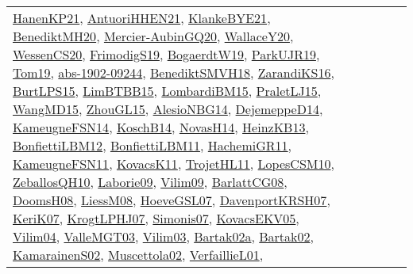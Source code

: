 {\begin{longtable}{lp{3cm}>{\raggedright}p{6cm}>{\raggedright}p{6cm}p{8cm}}
\href{papers/HanenKP21.pdf}{HanenKP21}\cite{HanenKP21}, \href{papers/AntuoriHHEN21.pdf}{AntuoriHHEN21}\cite{AntuoriHHEN21}, \href{papers/KlankeBYE21.pdf}{KlankeBYE21}\cite{KlankeBYE21}, \href{articles/BenediktMH20.pdf}{BenediktMH20}\cite{BenediktMH20}, \href{papers/Mercier-AubinGQ20.pdf}{Mercier-AubinGQ20}\cite{Mercier-AubinGQ20}, \href{articles/WallaceY20.pdf}{WallaceY20}\cite{WallaceY20}, \href{papers/WessenCS20.pdf}{WessenCS20}\cite{WessenCS20}, \href{papers/FrimodigS19.pdf}{FrimodigS19}\cite{FrimodigS19}, \href{papers/BogaerdtW19.pdf}{BogaerdtW19}\cite{BogaerdtW19}, \href{papers/ParkUJR19.pdf}{ParkUJR19}\cite{ParkUJR19}, \href{papers/Tom19.pdf}{Tom19}\cite{Tom19}, \href{articles/abs-1902-09244.pdf}{abs-1902-09244}\cite{abs-1902-09244}, \href{papers/BenediktSMVH18.pdf}{BenediktSMVH18}\cite{BenediktSMVH18}, \href{articles/ZarandiKS16.pdf}{ZarandiKS16}\cite{ZarandiKS16}, \href{papers/BurtLPS15.pdf}{BurtLPS15}\cite{BurtLPS15}, \href{papers/LimBTBB15.pdf}{LimBTBB15}\cite{LimBTBB15}, \href{papers/LombardiBM15.pdf}{LombardiBM15}\cite{LombardiBM15}, \href{papers/PraletLJ15.pdf}{PraletLJ15}\cite{PraletLJ15}, \href{articles/WangMD15.pdf}{WangMD15}\cite{WangMD15}, \href{papers/ZhouGL15.pdf}{ZhouGL15}\cite{ZhouGL15}, \href{papers/AlesioNBG14.pdf}{AlesioNBG14}\cite{AlesioNBG14}, \href{papers/DejemeppeD14.pdf}{DejemeppeD14}\cite{DejemeppeD14}, \href{articles/KameugneFSN14.pdf}{KameugneFSN14}\cite{KameugneFSN14}, \href{papers/KoschB14.pdf}{KoschB14}\cite{KoschB14}, \href{articles/NovasH14.pdf}{NovasH14}\cite{NovasH14}, \href{papers/HeinzKB13.pdf}{HeinzKB13}\cite{HeinzKB13}, \href{papers/BonfiettiLBM12.pdf}{BonfiettiLBM12}\cite{BonfiettiLBM12}, \href{papers/BonfiettiLBM11.pdf}{BonfiettiLBM11}\cite{BonfiettiLBM11}, \href{articles/HachemiGR11.pdf}{HachemiGR11}\cite{HachemiGR11}, \href{papers/KameugneFSN11.pdf}{KameugneFSN11}\cite{KameugneFSN11}, \href{articles/KovacsK11.pdf}{KovacsK11}\cite{KovacsK11}, \href{articles/TrojetHL11.pdf}{TrojetHL11}\cite{TrojetHL11}, \href{articles/LopesCSM10.pdf}{LopesCSM10}\cite{LopesCSM10}, \href{articles/ZeballosQH10.pdf}{ZeballosQH10}\cite{ZeballosQH10}, \href{papers/Laborie09.pdf}{Laborie09}\cite{Laborie09}, \href{papers/Vilim09.pdf}{Vilim09}\cite{Vilim09}, \href{papers/BarlattCG08.pdf}{BarlattCG08}\cite{BarlattCG08}, \href{papers/DoomsH08.pdf}{DoomsH08}\cite{DoomsH08}, \href{articles/LiessM08.pdf}{LiessM08}\cite{LiessM08}, \href{papers/HoeveGSL07.pdf}{HoeveGSL07}\cite{HoeveGSL07}, \href{papers/DavenportKRSH07.pdf}{DavenportKRSH07}\cite{DavenportKRSH07}, \href{papers/KeriK07.pdf}{KeriK07}\cite{KeriK07}, \href{papers/KrogtLPHJ07.pdf}{KrogtLPHJ07}\cite{KrogtLPHJ07}, \href{articles/Simonis07.pdf}{Simonis07}\cite{Simonis07}, \href{papers/KovacsEKV05.pdf}{KovacsEKV05}\cite{KovacsEKV05}, \href{papers/Vilim04.pdf}{Vilim04}\cite{Vilim04}, \href{papers/ValleMGT03.pdf}{ValleMGT03}\cite{ValleMGT03}, \href{papers/Vilim03.pdf}{Vilim03}\cite{Vilim03}, \href{papers/Bartak02a.pdf}{Bartak02a}\cite{Bartak02a}, \href{papers/Bartak02.pdf}{Bartak02}\cite{Bartak02}, \href{papers/KamarainenS02.pdf}{KamarainenS02}\cite{KamarainenS02}, \href{papers/Muscettola02.pdf}{Muscettola02}\cite{Muscettola02}, \href{papers/VerfaillieL01.pdf}{VerfaillieL01}\cite{VerfaillieL01}, 
\end{longtable}}
